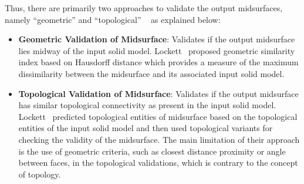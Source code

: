 Thus, there are primarily two approaches to validate the output midsurfaces, namely ``geometric'' and ``topological'' ~\cite{Lockett2008} as explained below:

\begin{itemize}[noitemsep,topsep=2pt,parsep=2pt,partopsep=2pt]
\item \textbf{Geometric Validation of Midsurface}: Validates if the output midsurface lies midway of the input solid model. Lockett~\cite{Lockett2008} proposed geometric similarity index based on Hausdorff distance which provides a measure of the maximum dissimilarity between the midsurface and its associated input solid model.
\item \textbf{Topological Validation of Midsurface}:
Validates if the output midsurface has similar topological connectivity as present in the input solid model. Lockett~\cite{Lockett2008} predicted topological entities of midsurface based on the topological entities of the input solid model and then used topological variants for checking the validity of the midsurface.  The main limitation of their approach is the use of geometric criteria, such as closest distance proximity or angle between faces, in the topological validations, which is contrary to the concept of topology.
\end{itemize}




